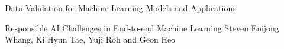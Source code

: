 \documentclass[11pt]{article}
\begin{document}
\begin{bulletin}
\begin{articlesection}{Data Validation for Machine Learning Models and Applications}
\begin{article}
{Responsible AI Challenges in End-to-end Machine Learning}
{Steven Euijong Whang, Ki Hyun Tae, Yuji Roh and Geon Heo}

\end{article}



\end{articlesection}




%
%



\begin{callsection}


\end{callsection}
\end{bulletin}
\end{document}
